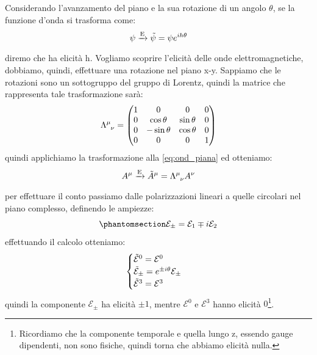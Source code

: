 Considerando l'avanzamento del piano e la sua rotazione di un angolo $\theta$, se la funzione d'onda si trasforma come:
\begin{equation}
    \psi
   \xrightarrow[\text{}]{\text{E}}
  \Tilde{\psi}= \psi e^{ih\theta}
\end{equation}
diremo che ha elicità h.
Vogliamo scoprire l'elicità delle onde elettromagnetiche, dobbiamo, quindi, effettuare una rotazione nel piano x-y. Sappiamo che le rotazioni sono un sottogruppo del gruppo di Lorentz, quindi la matrice che rappresenta tale trasformazione sarà:
\begin{equation}
    \Lambda\indices{^\mu_\nu}=
   \begin{pmatrix}
1 & 0 & 0 & 0   \\
0 &\cos{\theta}& \sin{\theta} & 0    \\
0 &-\sin{\theta}& \cos{\theta} & 0                   \\
 0 & 0 & 0 & 1
\end{pmatrix}
\end{equation}
quindi applichiamo la trasformazione alla \eqref{eq:ond_piana} ed otteniamo:
\begin{equation}
     A^\mu
   \xrightarrow[\text{}]{\text{E}}
  \Tilde{A}^\mu=\Lambda\indices{^\mu_\nu} A^\nu
\end{equation}
per effettuare il conto passiamo dalle polarizzazioni lineari a quelle circolari nel piano complesso, definendo le ampiezze:
\begin{equation}\phantomsection\label{eq:ampiezze_circ}
    \mathcal{E}_\pm= \mathcal{E}_1 \mp  i\mathcal{E}_2
\end{equation}
effettuando il calcolo otteniamo:
\begin{equation}
    \begin{cases}
       \Tilde{\mathcal{E}}^0 =\mathcal{E}^0\\
       \Tilde{\mathcal{E}}_\pm= e^{\pm i\theta} \mathcal{E}_\pm        \\
       \Tilde{\mathcal{E}}^3=\mathcal{E}^3
    \end{cases}
\end{equation}
quindi la componente $\mathcal{E}_\pm$ ha elicità $\pm 1$, mentre $\mathcal{E}^0$ e $\mathcal{E}^3$ hanno elicità $0$\footnote{Ricordiamo che la componente temporale e quella lungo z, essendo gauge dipendenti, non sono fisiche, quindi torna che abbiamo elicità nulla.}.


